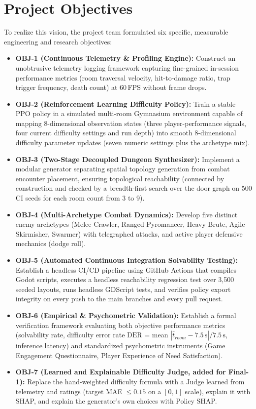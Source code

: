 \section{Project Objectives}
To realize this vision, the project team formulated six specific, measurable engineering and research objectives:
\begin{itemize}
    \item \textbf{OBJ-1 (Continuous Telemetry \& Profiling Engine):} Construct an unobtrusive telemetry logging framework capturing fine-grained in-session performance metrics (room traversal velocity, hit-to-damage ratio, trap trigger frequency, death count) at 60\,FPS without frame drops.
    \item \textbf{OBJ-2 (Reinforcement Learning Difficulty Policy):} Train a stable PPO policy in a simulated multi-room Gymnasium environment capable of mapping 8-dimensional observation states (three player-performance signals, four current difficulty settings and run depth) into smooth 8-dimensional difficulty parameter updates (seven numeric settings plus the archetype mix).
    \item \textbf{OBJ-3 (Two-Stage Decoupled Dungeon Synthesizer):} Implement a modular generator separating spatial topology generation from combat encounter placement, ensuring topological reachability (connected by construction and checked by a breadth-first search over the door graph on 500 CI seeds for each room count from 3 to 9).
    \item \textbf{OBJ-4 (Multi-Archetype Combat Dynamics):} Develop five distinct enemy archetypes (Melee Crawler, Ranged Pyromancer, Heavy Brute, Agile Skirmisher, Swarmer) with telegraphed attacks, and active player defensive mechanics (dodge roll).
    \item \textbf{OBJ-5 (Automated Continuous Integration Solvability Testing):} Establish a headless CI/CD pipeline using GitHub Actions that compiles Godot scripts, executes a headless reachability regression test over 3,500 seeded layouts, runs headless GDScript tests, and verifies policy export integrity on every push to the main branches and every pull request.
    \item \textbf{OBJ-6 (Empirical \& Psychometric Validation):} Establish a formal verification framework evaluating both objective performance metrics (solvability rate, difficulty error rate $\text{DER}$ = mean $|\bar{t}_{room} - 7.5\,\text{s}|/7.5\,\text{s}$, inference latency) and standardized psychometric instruments (Game Engagement Questionnaire, Player Experience of Need Satisfaction).
    \item \textbf{OBJ-7 (Learned and Explainable Difficulty Judge, added for Final-1):} Replace the hand-weighted difficulty formula with a Judge learned from telemetry and ratings (target MAE $\le 0.15$ on a $[0,1]$ scale), explain it with SHAP, and explain the generator's own choices with Policy SHAP.
\end{itemize}

